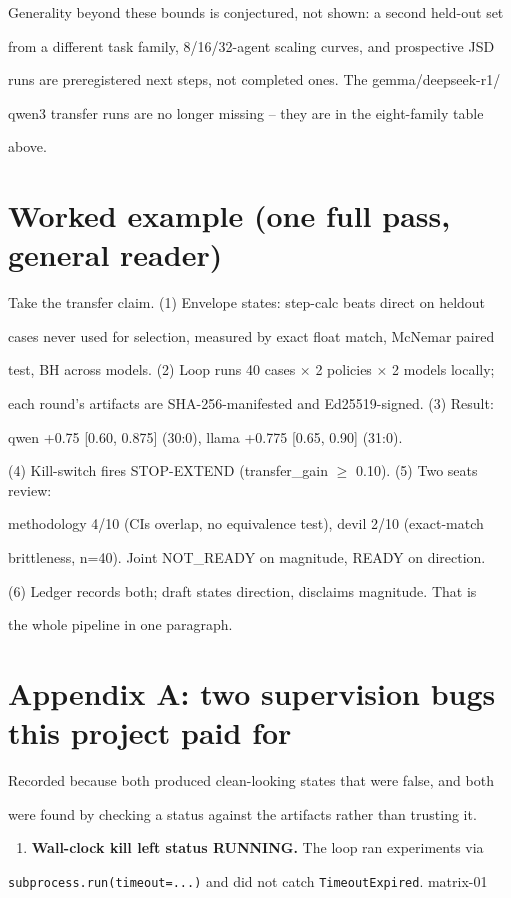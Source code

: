 \documentclass[11pt]{article}
\begin{document}
Generality beyond these bounds is conjectured, not shown: a second held-out set

from a different task family, 8/16/32-agent scaling curves, and prospective JSD

runs are preregistered next steps, not completed ones. The gemma/deepseek-r1/

qwen3 transfer runs are no longer missing -- they are in the eight-family table

above.


\section*{Worked example (one full pass, general reader)}

Take the transfer claim. (1) Envelope states: step-calc beats direct on heldout

cases never used for selection, measured by exact float match, McNemar paired

test, BH across models. (2) Loop runs 40 cases $\times$ 2 policies $\times$ 2 models locally;

each round's artifacts are SHA-256-manifested and Ed25519-signed. (3) Result:

qwen +0.75 [0.60, 0.875] (30:0), llama +0.775 [0.65, 0.90] (31:0).

(4) Kill-switch fires STOP-EXTEND (transfer\_gain $\ge$ 0.10). (5) Two seats review:

methodology 4/10 (CIs overlap, no equivalence test), devil 2/10 (exact-match

brittleness, n=40). Joint NOT\_READY on magnitude, READY on direction.

(6) Ledger records both; draft states direction, disclaims magnitude. That is

the whole pipeline in one paragraph.


\section*{Appendix A: two supervision bugs this project paid for}

Recorded because both produced clean-looking states that were false, and both

were found by checking a status against the artifacts rather than trusting it.


\begin{enumerate}\item {\bf Wall-clock kill left status RUNNING.} The loop ran experiments via
\end{enumerate}
\texttt{subprocess.run(timeout=...)} and did not catch \texttt{TimeoutExpired}. matrix-01
\end{document}
